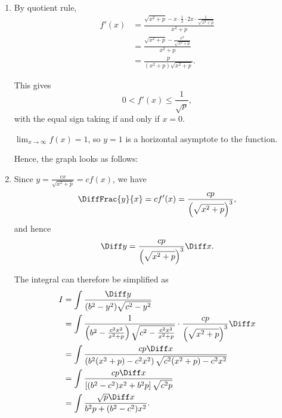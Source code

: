 \Question{\currfilebase}
\begin{enumerate}
    \item By quotient rule,
          \begin{align*}
              f'(x) & = \frac{\sqrt{x^2 + p} - x \cdot \frac{1}{2} \cdot 2x \cdot \frac{1}{\sqrt{x^2 + p}}}{x^2 + p} \\
                    & = \frac{\sqrt{x^2 + p} - \frac{x^2}{\sqrt{x^2 + p}}}{x^2 + p}                                  \\
                    & = \frac{p}{(x^2 + p) \sqrt{x^2 + p}}.
          \end{align*}

          This gives
          \[
              0 < f'(x) \leq \frac{1}{\sqrt{p}},
          \]
          with the equal sign taking if and only if \(x = 0\).

          \(\lim_{x \to \infty} f(x) = 1\), so \(y = 1\) is a horizontal asymptote to the function.

          Hence, the graph looks as follows:
          \begin{center}
              
          \end{center}

    \item Since \(y = \frac{cx}{\sqrt{x^2 + p}} = c f(x)\), we have
          \[
              \DiffFrac{y}{x} = c f'(x) = \frac{cp}{\left(\sqrt{x^2 + p}\right)^3},
          \]
          and hence
          \[
              \Diff y = \frac{cp}{\left(\sqrt{x^2 + p}\right)^3} \Diff x.
          \]

          The integral can therefore be simplified as
          \begin{align*}
              I & = \int \frac{\Diff y}{(b^2 - y^2) \sqrt{c^2 - y^2}}                                                                                                     \\
                & = \int \frac{1}{\left(b^2 - \frac{c^2 x^2}{x^2 + p}\right) \sqrt{c^2 - \frac{c^2 x^2}{x^2 + p}}} \cdot \frac{cp}{\left(\sqrt{x^2 + p}\right)^3} \Diff x \\
                & = \int \frac{cp \Diff x}{\left(b^2(x^2 + p) - c^2 x^2\right) \sqrt{c^2 (x^2 + p) - c^2 x^2}}                                                            \\
                & = \int \frac{cp \Diff x}{\left[(b^2 - c^2)x^2 + b^2 p\right]\sqrt{c^2 p}}                                                                               \\
                & = \int \frac{\sqrt{p} \Diff x}{b^2 p + (b^2 - c^2) x^2}.
          \end{align*}


\end{enumerate}
